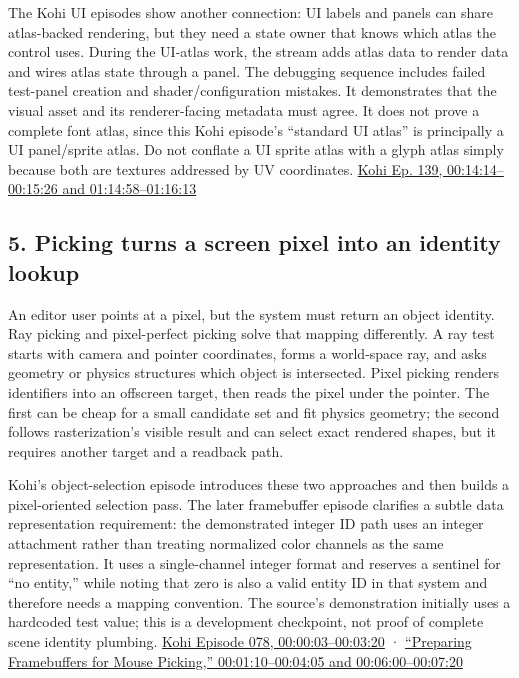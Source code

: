 The Kohi UI episodes show another connection: UI labels and panels can share atlas-backed rendering, but they need a state owner that knows which atlas the control uses. During the UI-atlas work, the stream adds atlas data to render data and wires atlas state through a panel. The debugging sequence includes failed test-panel creation and shader/configuration mistakes. It demonstrates that the visual asset and its renderer-facing metadata must agree. It does not prove a complete font atlas, since this Kohi episode's ``standard UI atlas'' is principally a UI panel/sprite atlas. Do not conflate a UI sprite atlas with a glyph atlas simply because both are textures addressed by UV coordinates. \href{https://www.youtube.com/watch?v=-V5z1bVjl_c&t=14m14s}{Kohi Ep. 139, 00:14:14--00:15:26 and 01:14:58--01:16:13}

\subsection{5. Picking turns a screen pixel into an identity lookup}\label{06-engine-ii-ch041-picking-turns-a-screen-pixel-into-an-identity-lookup}

An editor user points at a pixel, but the system must return an object identity. Ray picking and pixel-perfect picking solve that mapping differently. A ray test starts with camera and pointer coordinates, forms a world-space ray, and asks geometry or physics structures which object is intersected. Pixel picking renders identifiers into an offscreen target, then reads the pixel under the pointer. The first can be cheap for a small candidate set and fit physics geometry; the second follows rasterization's visible result and can select exact rendered shapes, but it requires another target and a readback path.

Kohi's object-selection episode introduces these two approaches and then builds a pixel-oriented selection pass. The later framebuffer episode clarifies a subtle data representation requirement: the demonstrated integer ID path uses an integer attachment rather than treating normalized color channels as the same representation. It uses a single-channel integer format and reserves a sentinel for ``no entity,'' while noting that zero is also a valid entity ID in that system and therefore needs a mapping convention. The source's demonstration initially uses a hardcoded test value; this is a development checkpoint, not proof of complete scene identity plumbing. \href{https://www.youtube.com/watch?v=mx1TyxNFrdo&t=3s}{Kohi Episode 078, 00:00:03--00:03:20} · \href{https://www.youtube.com/watch?v=wYVaIOUhz6s&t=1m10s}{``Preparing Framebuffers for Mouse Picking,'' 00:01:10--00:04:05 and 00:06:00--00:07:20}

